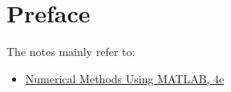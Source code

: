 \chapter*{Preface}

The notes mainly refer to:
\begin{itemize}
    \item \href{}{Numerical Methods Using MATLAB, 4e}
\end{itemize}

